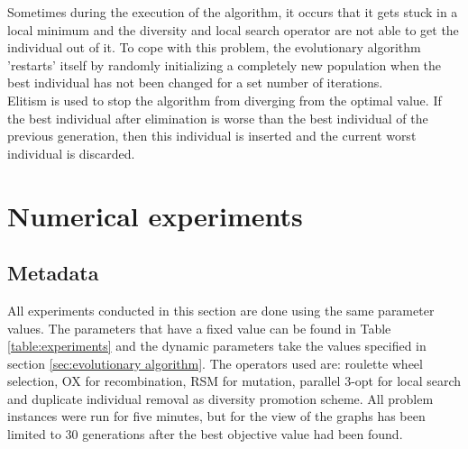 \documentclass[a4paper,10pt]{article}
\newcommand{\ReplaceMe}[1]{{\color{blue}#1}}
\newcommand{\RemoveMe}[1]{{\color{purple}#1}}
\begin{document}
Sometimes during the execution of the algorithm, it occurs that it gets stuck in a local minimum and the diversity and local search operator are not able to get the individual out of it. To cope with this problem, the evolutionary algorithm 'restarts' itself by randomly initializing a completely new population when the best individual has not been changed for a set number of iterations. \\

Elitism is used to stop the algorithm from diverging from the optimal value. If the best individual after elimination is worse than the best individual of the previous generation, then this individual is inserted and the current worst individual is discarded. 


\section{Numerical experiments}


\subsection{Metadata}



All experiments conducted in this section are done using the same parameter values. The parameters that have a fixed value can be found in Table \ref{table:experiments} and the dynamic parameters take the values specified in section \ref{sec:evolutionary algorithm}. The operators used are: roulette wheel selection, OX for recombination, RSM for mutation, parallel 3-opt for local search and duplicate individual removal as diversity promotion scheme. All problem instances were run for five minutes, but for the view of the graphs has been limited to 30 generations after the best objective value had been found.\\
\end{document}

